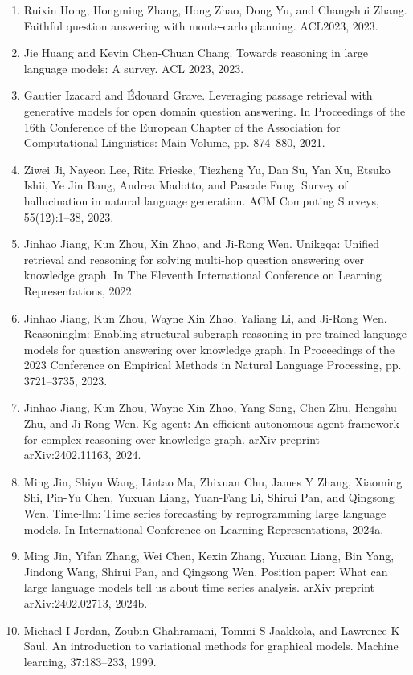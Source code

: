 \documentclass[11pt,UTF8,fontset=fandol]{ctexart}
\begin{document}
\begin{enumerate}[leftmargin=2em]
\item Ruixin Hong, Hongming Zhang, Hong Zhao, Dong Yu, and Changshui Zhang. Faithful question answering with monte-carlo planning. ACL2023, 2023.
\item Jie Huang and Kevin Chen-Chuan Chang. Towards reasoning in large language models: A survey. ACL 2023, 2023.
\item Gautier Izacard and \'Edouard Grave. Leveraging passage retrieval with generative models for open domain question answering. In Proceedings of the 16th Conference of the European Chapter of the Association for Computational Linguistics: Main Volume, pp. 874--880, 2021.
\item Ziwei Ji, Nayeon Lee, Rita Frieske, Tiezheng Yu, Dan Su, Yan Xu, Etsuko Ishii, Ye Jin Bang, Andrea Madotto, and Pascale Fung. Survey of hallucination in natural language generation. ACM Computing Surveys, 55(12):1--38, 2023.
\item Jinhao Jiang, Kun Zhou, Xin Zhao, and Ji-Rong Wen. Unikgqa: Unified retrieval and reasoning for solving multi-hop question answering over knowledge graph. In The Eleventh International Conference on Learning Representations, 2022.
\item Jinhao Jiang, Kun Zhou, Wayne Xin Zhao, Yaliang Li, and Ji-Rong Wen. Reasoninglm: Enabling structural subgraph reasoning in pre-trained language models for question answering over knowledge graph. In Proceedings of the 2023 Conference on Empirical Methods in Natural Language Processing, pp. 3721--3735, 2023.
\item Jinhao Jiang, Kun Zhou, Wayne Xin Zhao, Yang Song, Chen Zhu, Hengshu Zhu, and Ji-Rong Wen. Kg-agent: An efficient autonomous agent framework for complex reasoning over knowledge graph. arXiv preprint arXiv:2402.11163, 2024.
\item Ming Jin, Shiyu Wang, Lintao Ma, Zhixuan Chu, James Y Zhang, Xiaoming Shi, Pin-Yu Chen, Yuxuan Liang, Yuan-Fang Li, Shirui Pan, and Qingsong Wen. Time-llm: Time series forecasting by reprogramming large language models. In International Conference on Learning Representations, 2024a.
\item Ming Jin, Yifan Zhang, Wei Chen, Kexin Zhang, Yuxuan Liang, Bin Yang, Jindong Wang, Shirui Pan, and Qingsong Wen. Position paper: What can large language models tell us about time series analysis. arXiv preprint arXiv:2402.02713, 2024b.
\item Michael I Jordan, Zoubin Ghahramani, Tommi S Jaakkola, and Lawrence K Saul. An introduction to variational methods for graphical models. Machine learning, 37:183--233, 1999.

\end{enumerate}
\end{document}
